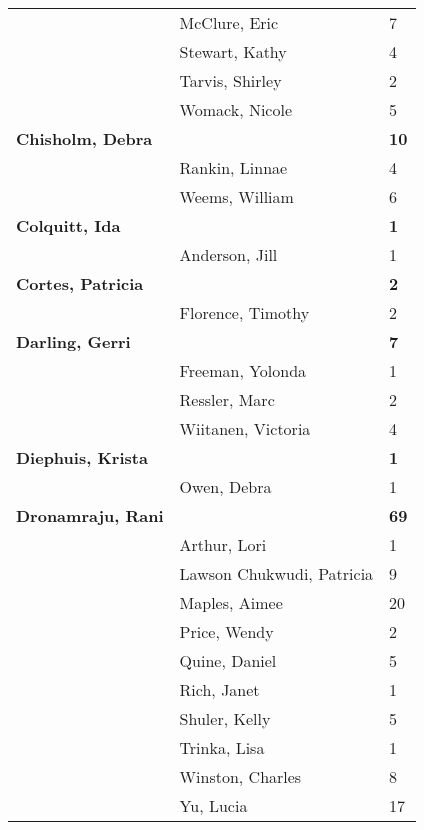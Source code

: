 \documentclass{article}\usepackage[]{graphicx}\usepackage[]{color}
\begin{document}
{\begin{longtable} { >{\raggedright}p{}|p{}p{}}
   & McClure, Eric & 7 \\ 
   & Stewart, Kathy & 4 \\ 
   & Tarvis, Shirley & 2 \\ 
   \rowcolor[gray]{0.90} & Womack, Nicole & 5 \\ 
   \rowcolor[gray]{0.90}\textbf{Chisholm, Debra} &  & \hspace{2cm}\textbf{10} \\ 
   \rowcolor[gray]{0.90} & Rankin, Linnae & 4 \\ 
   & Weems, William & 6 \\ 
  \textbf{Colquitt, Ida} &  & \hspace{2cm}\textbf{1} \\ 
   & Anderson, Jill & 1 \\ 
   \rowcolor[gray]{0.90}\textbf{Cortes, Patricia} &  & \hspace{2cm}\textbf{2} \\ 
   \rowcolor[gray]{0.90} & Florence, Timothy & 2 \\ 
   \rowcolor[gray]{0.90}\textbf{Darling, Gerri} &  & \hspace{2cm}\textbf{7} \\ 
   & Freeman, Yolonda & 1 \\ 
   & Ressler, Marc & 2 \\ 
   & Wiitanen, Victoria & 4 \\ 
   \rowcolor[gray]{0.90}\textbf{Diephuis, Krista} &  & \hspace{2cm}\textbf{1} \\ 
   \rowcolor[gray]{0.90} & Owen, Debra & 1 \\ 
   \rowcolor[gray]{0.90}\textbf{Dronamraju, Rani} &  & \hspace{2cm}\textbf{69} \\ 
   & Arthur, Lori & 1 \\ 
   & Lawson Chukwudi, Patricia & 9 \\ 
   & Maples, Aimee & 20 \\ 
   \rowcolor[gray]{0.90} & Price, Wendy & 2 \\ 
   \rowcolor[gray]{0.90} & Quine, Daniel & 5 \\ 
   \rowcolor[gray]{0.90} & Rich, Janet & 1 \\ 
   & Shuler, Kelly & 5 \\ 
   & Trinka, Lisa & 1 \\ 
   & Winston, Charles & 8 \\ 
   \rowcolor[gray]{0.90} & Yu, Lucia & 17 \\ 

\end{longtable}}
\end{document}
